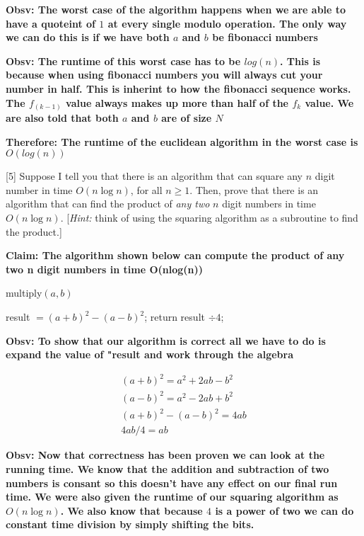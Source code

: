 \documentclass[addpoints]{exam}
\begin{document}
\begin{questions}
\textbf{Obsv: The worst case of the algorithm happens when we are able to have a quoteint of $1$ at every single modulo operation. The only way we can do this is if we have both $a$ and $b$ be fibonacci numbers}

\textbf{Obsv: The runtime of this worst case has to be $log(n)$. This is because when using fibonacci numbers you will always cut your number in half. This is inherint to how the fibonacci sequence works. The $f_(k-1)$ value always makes up more than half of the $f_k$ value. We are also told that both $a$ and $b$ are of size $N$}

\textbf{Therefore: The runtime of the euclidean algorithm in the worst case is $O(log(n))$}

[5]
Suppose I tell you that there is an algorithm that can square any $n$ digit number in time $O(n \log n)$, for all $n\ge 1$. Then, prove that there is an algorithm that can find the product of {\em any two} $n$ digit numbers in time $O(n \log n)$.  [{\em Hint:} think of using the squaring algorithm as a subroutine to find the product.]

\textbf{Claim: The algorithm shown below can compute the product of any two n digit numbers in time O(nlog(n))}
\begin{algorithm}[!h]
	\caption{multiply$(a, b)$}
	\begin{algorithmic}
		\State result $= (a+b)^2 - (a-b)^2$;
		\State return result $\div 4$;
	\end{algorithmic}
\end{algorithm}

\textbf{Obsv: To show that our algorithm is correct all we have to do is expand the value of "result and work through the algebra}

\begin{align*}
(a+b)^2 = a^2 + 2ab - b^2 \\
(a-b)^2 = a^2 - 2ab + b^2 \\
(a+b)^2 - (a-b)^2 = 4ab\\
4ab / 4 = ab
\end{align*}

\textbf{Obsv: Now that correctness has been proven we can look at the running time. We know that the addition and subtraction of two numbers is consant so this doesn't have any effect on our final run time. We were also given the runtime of our squaring algorithm as $O(n\log{n})$. We also know that because $4$ is a power of two we can do constant time division by simply shifting the bits.}


\end{questions}
\end{document}
